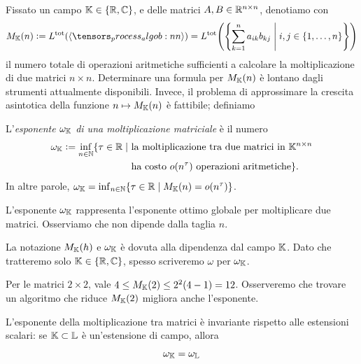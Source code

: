 Fissato un campo $ \mathbb{K} \in \{\mathbb{R},\mathbb{C}\}  $, e delle matrici $ A, B \in \mathbb{R}^{n\times
		n}$, denotiamo con
\begin{equation}
	\label{eq:def_Mn}
	M_{\K}(n) \defeq L^{\text{tot}} \left( \algob{n} \right) =  L^{\text{tot}} \left( \left\{
	\sum_{k=1}^n a_{ik}b_{kj} \; \middle| \; i,j \in \{1, \ldots, n\} \right\} \right)
\end{equation}
il numero totale di operazioni aritmetiche sufficienti a calcolare la moltiplicazione di due
matrici $ n\times n $. Determinare una formula per $ M_{\mathbb{K}}(n) $ è lontano dagli strumenti attualmente
disponibili. Invece, il problema di approssimare la crescita asintotica della funzione $ n \mapsto
	M_{\mathbb{K}}(n) $ è fattibile; definiamo

\begin{definition}
	\label{def:exponent_matmul}
	L'\emph{esponente $ \omega_{\mathbb{K}} $ di una moltiplicazione matriciale} è il numero
	\begin{equation*}
		\begin{aligned}
			\omega_{\mathbb{K}} \vcentcolon= \inf_{n\in \mathbb{N}}\{\tau \in \mathbb{R} \mid & \text{ la moltiplicazione tra due matrici in }
			\mathbb{K}^{n\times n}                                                                                       \\ & \text{ ha costo } o(n^\tau) \text{ operazioni aritmetiche} \}.
		\end{aligned}
	\end{equation*}
	In altre parole, $ \omega_{\mathbb{K}} = \inf_{n \in \mathbb{N}} \{\tau \in \mathbb{R} \mid M_{\mathbb{K}}(n) = o(n^\tau)\}  $.
\end{definition}
\begin{remark}
	L'esponente $ \omega_{\mathbb{K}} $ rappresenta l'esponente ottimo globale per moltiplicare due matrici.
	Osserviamo che non dipende dalla taglia $ n $.
\end{remark}
\begin{remark}
	La notazione $ M_{\mathbb{K}}(h) $ e $ \omega_{\mathbb{K}} $ è dovuta alla dipendenza dal campo $ \mathbb{K} $. Dato che tratteremo solo $ \mathbb{K} \in \{\mathbb{R}, \mathbb{C}\}  $, spesso
	scriveremo $ \omega $ per $ \omega_{\mathbb{K}} $.
\end{remark}
\begin{example}
	Per le matrici $ 2\times 2 $, vale $ 4 \le M_{\mathbb{K}}(2) \le 2^2(4 - 1) = 12 $. Osserveremo che trovare un algoritmo
	che riduce $ M_{\mathbb{K}}(2) $ migliora anche l'esponente.
\end{example}

\begin{theorem}
	L'esponente della moltiplicazione tra matrici è invariante rispetto alle estensioni scalari: se $
		\mathbb{K} \subset \mathbb{L} $ è un'estensione di campo, allora
	\begin{equation*}
		\omega_{\mathbb{K}} = \omega_{\mathbb{L}}
	\end{equation*}
\end{theorem}

